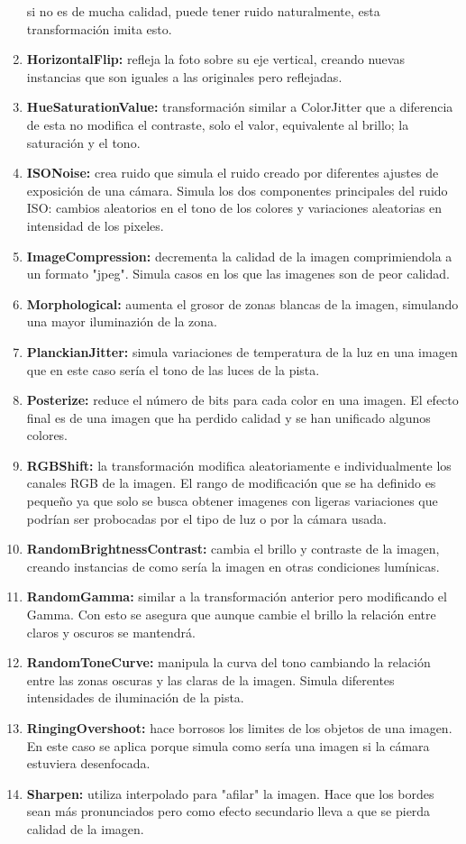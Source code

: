 \documentclass[12pt]{report} %
\begin{document}
\begin{enumerate}
        si no es de mucha calidad, puede tener ruido naturalmente, esta transformación imita esto.
        \item \textbf{HorizontalFlip:} refleja la foto sobre su eje vertical, creando nuevas instancias que son iguales a 
        las originales pero reflejadas. 
        \item \textbf{HueSaturationValue:} transformación similar a ColorJitter que a diferencia de esta no modifica el 
        contraste, solo el valor, equivalente al brillo; la saturación y el tono.
        \item \textbf{ISONoise:} crea ruido que simula el ruido creado por diferentes ajustes de exposición de una cámara.
        Simula los dos componentes principales del ruido ISO: cambios aleatorios en el tono de los colores y variaciones 
        aleatorias en intensidad de los pixeles.
        \item \textbf{ImageCompression:} decrementa la calidad de la imagen comprimiendola a un formato "jpeg". Simula casos
        en los que las imagenes son de peor calidad.
        \item \textbf{Morphological:} aumenta el grosor de zonas blancas de la imagen, simulando una mayor iluminazión de la zona. 
        \item \textbf{PlanckianJitter:} simula variaciones de temperatura de la luz en una imagen que en este caso sería el 
        tono de las luces de la pista.
        \item \textbf{Posterize:} reduce el número de bits para cada color en una imagen. El efecto final es de una imagen que
        ha perdido calidad y se han unificado algunos colores.
        \item \textbf{RGBShift:} la transformación modifica aleatoriamente e individualmente los canales RGB de la imagen.
        El rango de modificación que se ha definido es pequeño ya que solo se busca obtener imagenes con ligeras variaciones
        que podrían ser probocadas por el tipo de luz o por la cámara usada.
        \item \textbf{RandomBrightnessContrast:} cambia el brillo y contraste de la imagen, creando instancias de como sería 
        la imagen en otras condiciones lumínicas.
        \item \textbf{RandomGamma:} similar a la transformación anterior pero modificando el Gamma. Con esto se asegura que 
        aunque cambie el brillo la relación entre claros y oscuros se mantendrá.
        \item \textbf{RandomToneCurve:} manipula la curva del tono cambiando la relación entre las zonas oscuras y las claras 
        de la imagen. Simula diferentes intensidades de iluminación de la pista.
        \item \textbf{RingingOvershoot:} hace borrosos los limites de los objetos de una imagen. En este caso se aplica porque
        simula como sería una imagen si la cámara estuviera desenfocada.
        \item \textbf{Sharpen:} utiliza interpolado para "afilar" la imagen. Hace que los bordes sean más pronunciados pero como 
        efecto secundario lleva a que se pierda calidad de la imagen.
    \end{enumerate}
\end{document}
